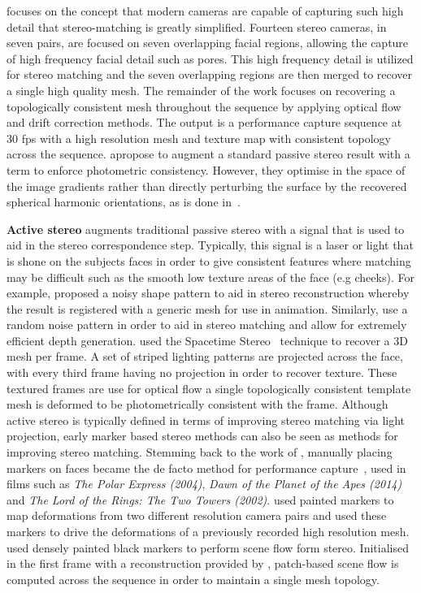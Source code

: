 focuses on the concept that modern cameras are capable of capturing such high
detail that stereo-matching is greatly simplified. Fourteen stereo cameras, in
seven pairs, are focused on seven overlapping facial regions, allowing the
capture of high frequency facial detail such as pores. This high frequency
detail is utilized for stereo matching and the seven overlapping regions are
then merged to recover a single high quality mesh. The remainder of the work
focuses on recovering a topologically consistent mesh throughout the sequence by
applying optical flow and drift correction methods. The output is a performance
capture sequence at 30 fps with a high resolution mesh and texture map
with consistent topology across the sequence.
\citet{wu2011high} apropose to augment a standard passive stereo result with 
a term to enforce photometric consistency. However, they optimise in the space 
of the image gradients rather than directly perturbing the surface by the 
recovered spherical harmonic orientations, as is done 
in~\cite{nehab2005efficiently}.

\textbf{Active stereo} augments traditional passive stereo with a signal that is
used to aid in the stereo correspondence step. Typically, this signal is a laser
or light that is shone on the subjects faces in order to give consistent
features where matching may be difficult such as the smooth low texture areas of
the face (e.g cheeks). For example, \citet{enciso1999synthesis} proposed a noisy
shape pattern to aid in stereo reconstruction whereby the result is registered
with a generic mesh for use in animation. Similarly, \citet{d2002modeling}
use a random noise pattern in order to aid in stereo matching and allow
for extremely efficient depth generation.
\citet{zhang2004spacetime} used the
Spacetime Stereo~\cite{zhang2003spacetime,davis2005spacetime} technique to
recover a 3D mesh per frame. A set of striped lighting patterns are projected
across the face, with every third frame having no projection in order to recover
texture. These textured frames are use for optical flow a single topologically
consistent template mesh is deformed to be photometrically consistent with the
frame.
Although active stereo is typically defined in terms of improving stereo
matching via light projection, early marker based stereo methods can also be
seen as methods for improving stereo matching.
Stemming back to the work of \citet{williams1990performance}, manually placing
markers on faces became the de facto method for performance
capture~\cite{bickel2007multi,furukawa2009dense,bredow2005mocap},
used in films such as \textit{The Polar Express (2004)},
\textit{Dawn of the Planet of the Apes (2014)} and
\textit{The Lord of the Rings: The Two Towers (2002)}.
\citet{bickel2007multi} used painted markers to map deformations from two
different resolution camera pairs and used these markers to drive the
deformations of a previously recorded high resolution mesh.
\citet{furukawa2009dense} used densely painted black markers to perform
scene flow form stereo. Initialised in the first frame with a reconstruction
provided by \citet{Furu:2010:PMVS}, patch-based scene flow is computed across
the sequence in order to maintain a single mesh topology.

